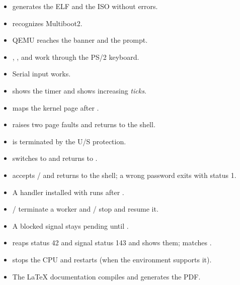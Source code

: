 \begin{itemize}
  \item[$\square$]  generates the ELF and the ISO without errors.
  \item[$\square$]  recognizes Multiboot2.
  \item[$\square$] QEMU reaches the banner and the  prompt.
  \item[$\square$] , ,  and 
        work through the PS/2 keyboard.
  \item[$\square$] Serial input works.
  \item[$\square$]  shows the timer and  shows
        increasing \emph{ticks}.
  \item[$\square$]  maps the kernel page after
        .
  \item[$\square$]  raises two page faults and returns to the shell.
  \item[$\square$]  is terminated by the U/S protection.
  \item[$\square$]  switches to  and 
        returns to .
  \item[$\square$]  accepts / and returns
        to the shell; a wrong password exits with status 1.
  \item[$\square$] A  handler installed with  runs after .
  \item[$\square$] / terminate a worker and
        / stop and resume it.
  \item[$\square$] A blocked signal stays pending until .
  \item[$\square$]  reaps status 42 and signal status 143 and shows
        them;  matches .
  \item[$\square$]  stops the CPU and  restarts (when the
        environment supports it).
  \item[$\square$] The LaTeX documentation compiles and generates the PDF.
\end{itemize}
